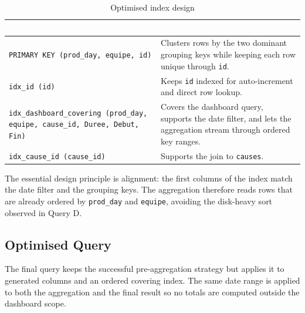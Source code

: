 \begin{table}[H]
\centering
\small
\caption{Optimised index design}
\label{tab:chapter3-6}
\setlength{\extrarowheight}{2pt}
\begin{tabular}{@{}>{\raggedright\arraybackslash}p{5.4cm}>{\raggedright\arraybackslash}p{8.3cm}@{}}
    \toprule
    \rowcolor[HTML]{1A5490}
    \textcolor{white}{\textbf{Index}} & \textcolor{white}{\textbf{Purpose}} \\
    \midrule
    \rowcolor[HTML]{E8F4F8}
    \texttt{PRIMARY KEY (prod\_day, equipe, id)} & Clusters rows by the two dominant grouping keys while keeping each row unique through \texttt{id}. \\
    \rowcolor[HTML]{FFFFFF}
    \texttt{idx\_id (id)} & Keeps \texttt{id} indexed for auto-increment and direct row lookup. \\
    \rowcolor[HTML]{E8F4F8}
    \texttt{idx\_dashboard\_covering (prod\_day, equipe, cause\_id, Duree, Debut, Fin)} & Covers the dashboard query, supports the date filter, and lets the aggregation stream through ordered key ranges. \\
    \rowcolor[HTML]{FFFFFF}
    \texttt{idx\_cause\_id (cause\_id)} & Supports the join to \texttt{causes}. \\
    \bottomrule
\end{tabular}
\end{table}

The essential design principle is alignment: the first columns of the index match the date filter and the grouping keys. The aggregation therefore reads rows that are already ordered by \texttt{prod\_day} and \texttt{equipe}, avoiding the disk-heavy sort observed in Query D.

\subsection{Optimised Query}

The final query keeps the successful pre-aggregation strategy but applies it to generated columns and an ordered covering index. The same date range is applied to both the aggregation and the final result so no totals are computed outside the dashboard scope.

